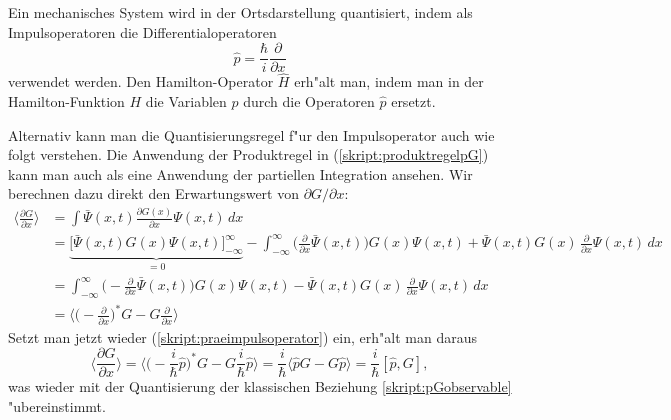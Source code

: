 \begin{satz}
\label{skript:quantisierungsregeln-ortsdarstellung}
Ein mechanisches System wird in der Ortsdarstellung quantisiert,
indem als Impulsoperatoren die Differentialoperatoren
\[
\hat p=\frac{\hbar}{i}\frac{\partial}{\partial x}
\]
verwendet werden. Den Hamilton-Operator $\hat H$ erh"alt man, indem man
in der Hamilton-Funktion $H$ die Variablen $p$ durch die Operatoren 
$\hat p$ ersetzt.
\end{satz}

{\small
Alternativ kann man die Quantisierungsregel f"ur den Impulsoperator
auch wie folgt verstehen.
Die Anwendung der Produktregel in (\ref{skript:produktregelpG}) kann
man auch als eine Anwendung der partiellen Integration ansehen.
Wir berechnen dazu direkt den Erwartungswert von $\partial G/\partial x$:
\begin{align*}
\biggl\langle
\frac{\partial G}{\partial x}
\biggr\rangle
&=
\int \bar\Psi(x,t)\frac{\partial G(x)}{\partial x}\Psi(x,t)\,dx
\\
&=
\underbrace{
\biggl[
\bar\Psi(x,t) G(x)\Psi(x,t)
\biggr]_{-\infty}^\infty}_{=0}
-
\int_{-\infty}^{\infty}
\biggl(\frac{\partial}{\partial x}
\bar\Psi(x,t)\biggr) G(x)
\Psi(x,t)
+
\bar\Psi(x,t) G(x)
\,
\frac{\partial}{\partial x}
\Psi(x,t)
\,dx
\\
&=
\int_{-\infty}^{\infty}
\biggl(-\frac{\partial}{\partial x}
\bar\Psi(x,t)\biggr) G(x)
\Psi(x,t)
-
\bar\Psi(x,t) G(x)
\,
\frac{\partial}{\partial x}
\Psi(x,t)
\,dx
\\
&=\biggl\langle
\biggl(-\frac{\partial}{\partial x}\biggr)^* G
- G\frac{\partial}{\partial x}
\biggr\rangle
\end{align*}
Setzt man jetzt wieder (\ref{skript:praeimpulsoperator}) ein, erh"alt
man daraus
\[
\biggl\langle
\frac{\partial G}{\partial x}
\biggr\rangle
=
\biggl\langle
\biggl(-\frac{i}{\hbar}\hat p
\biggr)^* G
- G\frac{i}{\hbar}\hat p
\biggr\rangle
=
\frac{i}{\hbar}
\biggl\langle
\hat p
 G
- G \hat p
\biggr\rangle
=
\frac{i}{\hbar}[\hat p,G],
\]
was wieder mit der Quantisierung der klassischen Beziehung
\ref{skript:pGobservable} "ubereinstimmt.
}

